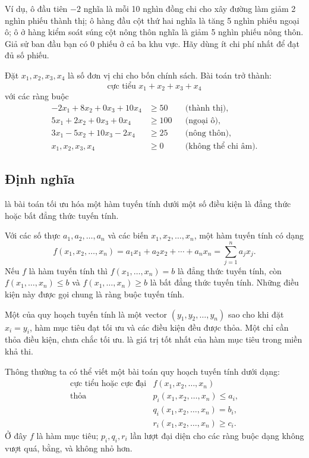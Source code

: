 \documentclass[11pt]{article}
\begin{document}
Ví dụ, ô đầu tiên $-2$ nghĩa là mỗi 10 nghìn đồng chi cho xây đường làm giảm
2 nghìn phiếu thành thị; ô hàng đầu cột thứ hai nghĩa là tăng 5 nghìn phiếu
ngoại ô; ô ở hàng kiểm soát súng cột nông thôn nghĩa là giảm 5 nghìn phiếu
nông thôn. Giả sử ban đầu bạn có 0 phiếu ở cả ba khu vực. Hãy dùng ít chi phí
nhất để đạt đủ số phiếu.

Đặt $x_1,x_2,x_3,x_4$ là số đơn vị chi cho bốn chính sách. Bài toán trở thành:
\[
  \text{cực tiểu } x_1+x_2+x_3+x_4
\]
với các ràng buộc
\[
\begin{aligned}
-2x_1+8x_2+0x_3+10x_4 &\ge 50 && \text{(thành thị)},\\
 5x_1+2x_2+0x_3+0x_4 &\ge 100 && \text{(ngoại ô)},\\
 3x_1-5x_2+10x_3-2x_4 &\ge 25 && \text{(nông thôn)},\\
 x_1,x_2,x_3,x_4 &\ge 0 && \text{(không thể chi âm)}.
\end{aligned}
\]

\subsection*{Định nghĩa}

 là bài toán tối ưu hóa một hàm tuyến tính dưới
một số điều kiện là đẳng thức hoặc bất đẳng thức tuyến tính.

Với các số thực $a_1,a_2,\ldots,a_n$ và các biến
$x_1,x_2,\ldots,x_n$, một hàm tuyến tính có dạng
\[
  f(x_1,x_2,\ldots,x_n)
  = a_1x_1+a_2x_2+\cdots+a_nx_n
  = \sum_{j=1}^{n} a_jx_j.
\]
Nếu $f$ là hàm tuyến tính thì $f(x_1,\ldots,x_n)=b$ là đẳng thức tuyến tính,
còn $f(x_1,\ldots,x_n)\le b$ và $f(x_1,\ldots,x_n)\ge b$ là bất đẳng thức
tuyến tính. Những điều kiện này được gọi chung là ràng buộc tuyến tính.

Một  của quy hoạch tuyến tính là một vector
$(y_1,y_2,\ldots,y_n)$ sao cho khi đặt $x_i=y_i$, hàm mục tiêu đạt tối ưu và
các điều kiện đều được thỏa. Một  chỉ cần thỏa điều
kiện, chưa chắc tối ưu.  là giá trị tốt nhất của hàm mục
tiêu trong miền khả thi.

Thông thường ta có thể viết một bài toán quy hoạch tuyến tính dưới dạng:
\[
\begin{array}{ll}
\text{cực tiểu hoặc cực đại} & f(x_1,x_2,\ldots,x_n)\\
\text{thỏa} & p_i(x_1,x_2,\ldots,x_n)\le a_i,\\
            & q_i(x_1,x_2,\ldots,x_n)=b_i,\\
            & r_i(x_1,x_2,\ldots,x_n)\ge c_i.
\end{array}
\]
Ở đây $f$ là hàm mục tiêu; $p_i,q_i,r_i$ lần lượt đại diện cho các ràng buộc
dạng không vượt quá, bằng, và không nhỏ hơn.
\end{document}

